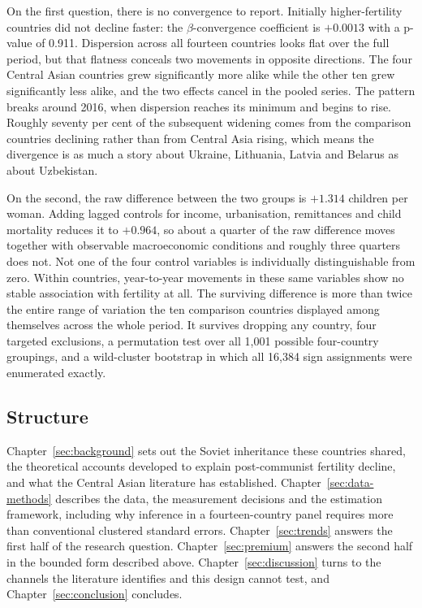 On the first question, there is no convergence to report. Initially higher-fertility countries did not decline faster: the $\beta$-convergence coefficient is $+0.0013$ with a p-value of 0.911. Dispersion across all fourteen countries looks flat over the full period, but that flatness conceals two movements in opposite directions. The four Central Asian countries grew significantly more alike while the other ten grew significantly less alike, and the two effects cancel in the pooled series. The pattern breaks around 2016, when dispersion reaches its minimum and begins to rise. Roughly seventy per cent of the subsequent widening comes from the comparison countries declining rather than from Central Asia rising, which means the divergence is as much a story about Ukraine, Lithuania, Latvia and Belarus as about Uzbekistan.

On the second, the raw difference between the two groups is $+1.314$ children per woman. Adding lagged controls for income, urbanisation, remittances and child mortality reduces it to $+0.964$, so about a quarter of the raw difference moves together with observable macroeconomic conditions and roughly three quarters does not. Not one of the four control variables is individually distinguishable from zero. Within countries, year-to-year movements in these same variables show no stable association with fertility at all. The surviving difference is more than twice the entire range of variation the ten comparison countries displayed among themselves across the whole period. It survives dropping any country, four targeted exclusions, a permutation test over all 1{,}001 possible four-country groupings, and a wild-cluster bootstrap in which all 16{,}384 sign assignments were enumerated exactly.

\subsection{Structure}
\label{sec:structure}

Chapter~\ref{sec:background} sets out the Soviet inheritance these countries shared, the theoretical accounts developed to explain post-communist fertility decline, and what the Central Asian literature has established. Chapter~\ref{sec:data-methods} describes the data, the measurement decisions and the estimation framework, including why inference in a fourteen-country panel requires more than conventional clustered standard errors. Chapter~\ref{sec:trends} answers the first half of the research question. Chapter~\ref{sec:premium} answers the second half in the bounded form described above. Chapter~\ref{sec:discussion} turns to the channels the literature identifies and this design cannot test, and Chapter~\ref{sec:conclusion} concludes.
